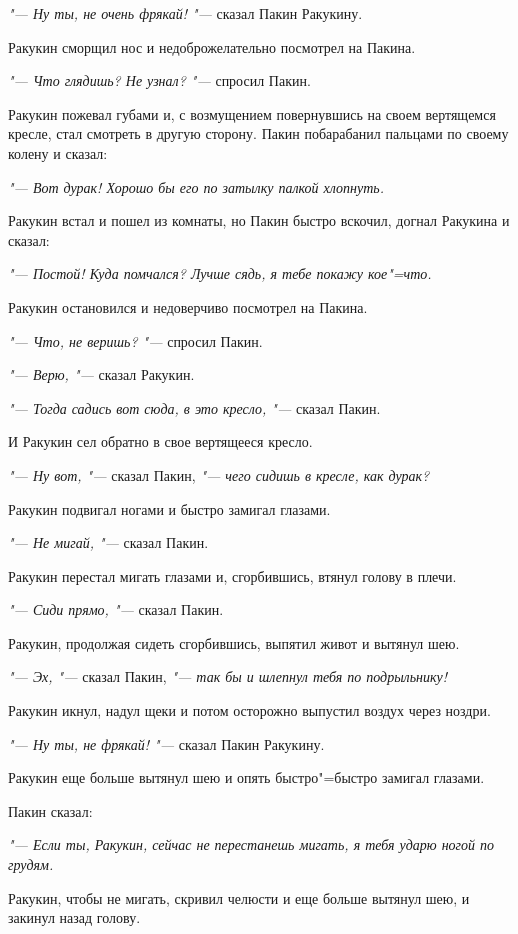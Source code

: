 
\textit{"--- Ну ты, не очень фрякай! "---} сказал Пакин Ракукину.

Ракукин сморщил нос и недоброжелательно посмотрел на Пакина.

\textit{"--- Что глядишь? Не узнал? "---} спросил Пакин.

Ракукин пожевал губами и, с возмущением повернувшись на своем вертящемся кресле, стал смотреть в другую сторону. Пакин побарабанил пальцами по своему колену и сказал:

\textit{"--- Вот дурак! Хорошо бы его по затылку палкой хлопнуть.}

Ракукин встал и пошел из комнаты, но Пакин быстро вскочил, догнал Ракукина и сказал:

\textit{"--- Постой! Куда помчался? Лучше сядь, я тебе покажу кое"=что.}

Ракукин остановился и недоверчиво посмотрел на Пакина.

\textit{"--- Что, не веришь? "---} спросил Пакин.

\textit{"--- Верю, "---} сказал Ракукин.

\textit{"--- Тогда садись вот сюда, в это кресло, "---} сказал Пакин.

И Ракукин сел обратно в свое вертящееся кресло.

\textit{"--- Ну вот, "---} сказал Пакин, \textit{"--- чего сидишь в кресле, как дурак?}

Ракукин подвигал ногами и быстро замигал глазами.

\textit{"--- Не мигай, "---} сказал Пакин.

Ракукин перестал мигать глазами и, сгорбившись, втянул голову в плечи.

\textit{"--- Сиди прямо, "---} сказал Пакин.

Ракукин, продолжая сидеть сгорбившись, выпятил живот и вытянул шею.

\textit{"--- Эх, "---} сказал Пакин, \textit{"--- так бы и шлепнул тебя по подрыльнику!}

Ракукин икнул, надул щеки и потом осторожно выпустил воздух через ноздри.

\textit{"--- Ну ты, не фрякай! "---} сказал Пакин Ракукину.

Ракукин еще больше вытянул шею и опять быстро"=быстро замигал глазами.

Пакин сказал:

\textit{"--- Если ты, Ракукин, сейчас не перестанешь мигать, я тебя ударю ногой по грудям.}

Ракукин, чтобы не мигать, скривил челюсти и еще больше вытянул шею, и закинул назад голову.

